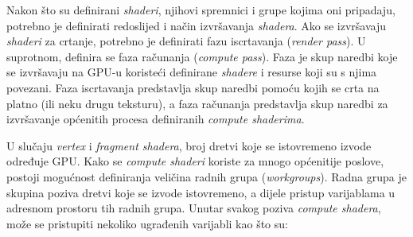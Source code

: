\documentclass{foi}
\begin{document}
Nakon što su definirani \textit{shaderi}, njihovi spremnici  i grupe kojima oni pripadaju, potrebno je definirati redoslijed i način izvršavanja \textit{shadera}. Ako se izvršavaju \textit{shaderi} za crtanje, potrebno je definirati fazu iscrtavanja (\textit{render pass}). U suprotnom, definira se faza računanja (\textit{compute pass}). Faza je skup naredbi koje se izvršavaju na GPU-u koristeći definirane \textit{shadere} i resurse koji su s njima povezani. Faza iscrtavanja predstavlja skup naredbi pomoću kojih se crta na platno (ili neku drugu teksturu), a faza računanja predstavlja skup naredbi za izvršavanje općenitih procesa definiranih \textit{compute shaderima}.  

U slučaju \textit{vertex} i \textit{fragment shadera}, broj dretvi koje se istovremeno izvode određuje GPU. Kako se \textit{compute shaderi} koriste za mnogo općenitije poslove, postoji mogućnost definiranja veličina radnih grupa (\textit{workgroups}). Radna grupa je skupina poziva dretvi koje se izvode istovremeno, a dijele pristup varijablama u adresnom prostoru tih radnih grupa. Unutar svakog poziva \textit{compute shadera}, može se pristupiti nekoliko ugrađenih varijabli kao što su:
\end{document}
